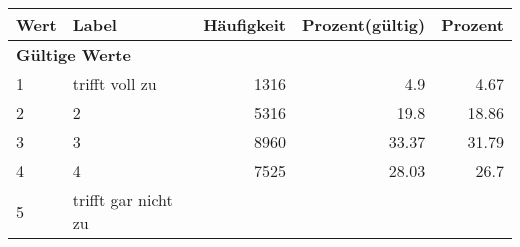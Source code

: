      \begin{longtable}{lXrrr}
     \toprule
     \textbf{Wert} & \textbf{Label} & \textbf{Häufigkeit} & \textbf{Prozent(gültig)} & \textbf{Prozent} \\
     \endhead
     \midrule
     \multicolumn{5}{l}{\textbf{Gültige Werte}}\\

     1 &
     \multicolumn{1}{X}{ trifft voll zu   } &


       \num{1316} &
       \num[round-mode=places,round-precision=2]{4,9} &
         \num[round-mode=places,round-precision=2]{4,67} \\

     2 &
     \multicolumn{1}{X}{ 2   } &


       \num{5316} &
       \num[round-mode=places,round-precision=2]{19,8} &
         \num[round-mode=places,round-precision=2]{18,86} \\

     3 &
     \multicolumn{1}{X}{ 3   } &


       \num{8960} &
       \num[round-mode=places,round-precision=2]{33,37} &
         \num[round-mode=places,round-precision=2]{31,79} \\

     4 &
     \multicolumn{1}{X}{ 4   } &


       \num{7525} &
       \num[round-mode=places,round-precision=2]{28,03} &
         \num[round-mode=places,round-precision=2]{26,7} \\

     5 &
     \multicolumn{1}{X}{ trifft gar nicht zu   } &



\end{longtable}

